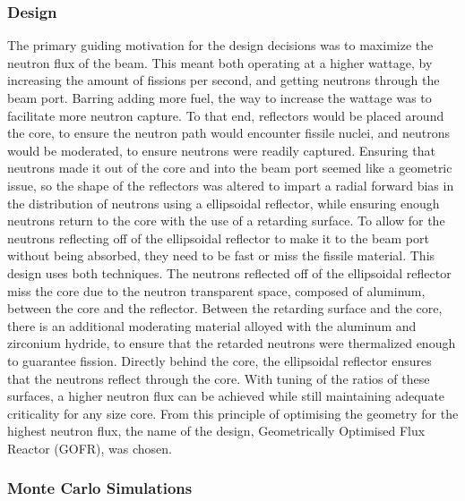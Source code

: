 \subsubsection{Design}

The primary guiding motivation for the design decisions was to maximize the neutron flux of the beam. This meant both operating at a higher wattage, by increasing the amount of fissions per second, and getting neutrons through the beam port. Barring adding more fuel, the way to increase the wattage was to facilitate more neutron capture. To that end, reflectors would be placed around the core, to ensure the neutron path would encounter fissile nuclei, and neutrons would be moderated, to ensure neutrons were readily captured. Ensuring that neutrons made it out of the core and into the beam port seemed like a geometric issue, so the shape of the reflectors was altered to impart a radial forward bias in the distribution of neutrons using a ellipsoidal reflector, while ensuring enough neutrons return to the core with the use of a retarding surface. To allow for the neutrons reflecting off of the ellipsoidal reflector to make it to the beam port without being absorbed, they need to be fast or miss the fissile material. This design uses both techniques. The neutrons reflected off of the ellipsoidal reflector miss the core due to the neutron transparent space, composed of aluminum, between the core and the reflector. Between the retarding surface and the core, there is an additional moderating material alloyed with the aluminum and zirconium hydride, to ensure that the retarded neutrons were thermalized enough to guarantee fission. Directly behind the core, the ellipsoidal reflector ensures that the neutrons reflect through the core. With tuning of the ratios of these surfaces, a higher neutron flux can be achieved while still maintaining adequate criticality for any size core. From this principle of optimising the geometry for the highest neutron flux, the name of the design, Geometrically Optimised Flux Reactor (GOFR), was chosen.


\subsubsection{Monte Carlo Simulations}

